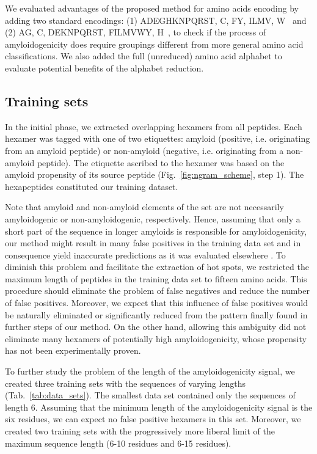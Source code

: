 \documentclass[fleqn,10pt,twoside]{gcb15submission}
\begin{document}
  We evaluated advantages of the proposed method for amino acids encoding by 
adding two standard encodings: (1) ADEGHKNPQRST, C, FY, ILMV, W~\citep{kosiol_new_2004} 
and (2) AG, C, DEKNPQRST, FILMVWY, H~\citep{melo_accuracy_2006}, to check if the process 
of amyloidogenicity does require groupings different from more general 
amino acid classifications. We also added the full (unreduced) amino acid 
alphabet to evaluate potential benefits of the alphabet reduction.

\subsection{Training sets}

In the initial phase, we extracted overlapping hexamers from all peptides. Each 
hexamer was tagged with one of two etiquettes: amyloid (positive, i.e. 
originating from an amyloid peptide) or non-amyloid (negative, i.e. originating 
from a non-amyloid peptide). The etiquette ascribed to the hexamer was based on 
the amyloid propensity of its source peptide (Fig.~\ref{fig:ngram_scheme}, step 1). 
The hexapeptides constituted our training dataset. 

  Note that amyloid and non-amyloid elements of the set are not necessarily 
amyloidogenic or non-amyloidogenic, respectively. Hence, assuming that only a 
short part of the sequence in longer amyloids is responsible for 
amyloidogenicity, our method might result in many false positives in the 
training data set and in consequence yield inaccurate predictions as it was 
evaluated elsewhere \citep{kotulska_amyloid_2013}. To diminish this problem and 
facilitate the extraction of hot spots, we restricted the maximum length of 
peptides in the training data set to fifteen amino acids. This procedure should 
eliminate the problem of false negatives and reduce the number of false 
positives. Moreover, we expect that this  influence of false positives  would be 
naturally eliminated or significantly reduced from the pattern finally found in 
further steps of our method. On the other hand, allowing this ambiguity did not eliminate 
many hexamers of potentially high amyloidogenicity, whose propensity has not 
been experimentally proven. 

  To further study the problem of the length of the amyloidogenicity signal, 
we created three training sets with the sequences of varying lengths 
(Tab.~\ref{tab:data_sets}). The smallest data set contained only the sequences 
of length 6. Assuming that the minimum length of the amyloidogenicity signal is 
the six residues, we can expect no false positive hexamers in this set. 
Moreover, we created two training sets with the progressively more liberal limit 
of the maximum sequence length (6-10 residues and 6-15 residues).
\end{document}
